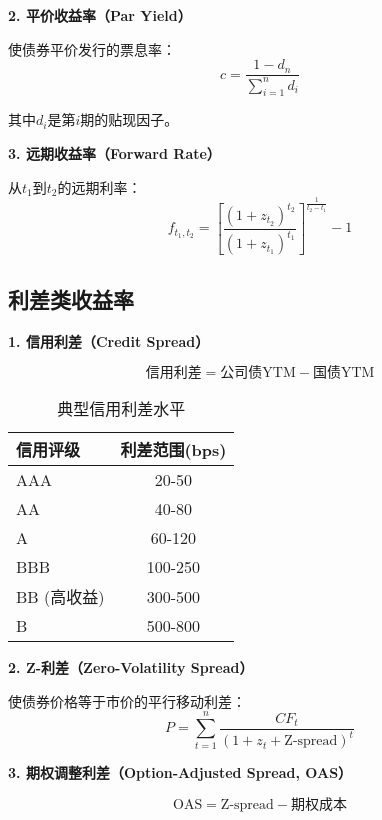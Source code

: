 \textbf{2. 平价收益率（Par Yield）}

使债券平价发行的票息率：
\begin{equation}
c = \frac{1-d_n}{\sum_{i=1}^{n} d_i}
\end{equation}

其中$d_i$是第$i$期的贴现因子。

\textbf{3. 远期收益率（Forward Rate）}

从$t_1$到$t_2$的远期利率：
\begin{equation}
f_{t_1,t_2} = \left[\frac{(1+z_{t_2})^{t_2}}{(1+z_{t_1})^{t_1}}\right]^{\frac{1}{t_2-t_1}} - 1
\end{equation}

\subsection{利差类收益率}

\textbf{1. 信用利差（Credit Spread）}

\begin{equation}
\text{信用利差} = \text{公司债YTM} - \text{国债YTM}
\end{equation}

\begin{table}[H]
\centering
\caption{典型信用利差水平}
\begin{tabular}{|l|c|}
\hline
\textbf{信用评级} & \textbf{利差范围(bps)} \\
\hline
AAA & 20-50 \\
AA & 40-80 \\
A & 60-120 \\
BBB & 100-250 \\
BB (高收益) & 300-500 \\
B & 500-800 \\
\hline
\end{tabular}
\end{table}

\textbf{2. Z-利差（Zero-Volatility Spread）}

使债券价格等于市价的平行移动利差：
\begin{equation}
P = \sum_{t=1}^{n} \frac{CF_t}{(1+z_t+\text{Z-spread})^t}
\end{equation}

\textbf{3. 期权调整利差（Option-Adjusted Spread, OAS）}

\begin{equation}
\text{OAS} = \text{Z-spread} - \text{期权成本}
\end{equation}

